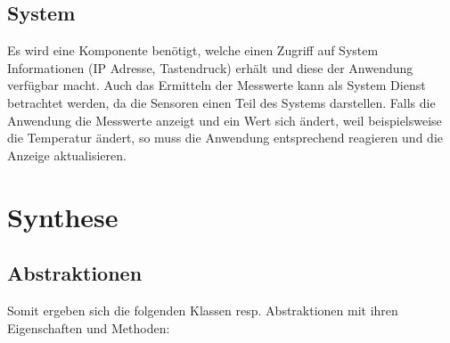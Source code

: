 \documentclass[
    10pt,
    a4paper,
]{scrartcl}
\begin{document}
\subsection{System}
Es wird eine Komponente benötigt, welche einen Zugriff auf System Informationen (IP
Adresse, Tastendruck) erhält und diese der Anwendung verfügbar macht. Auch das Ermitteln
der Messwerte kann als System Dienst betrachtet werden, da die Sensoren einen Teil des
Systems darstellen. Falls die Anwendung die Messwerte anzeigt und ein Wert sich ändert,
weil beispielsweise die Temperatur ändert, so muss die Anwendung entsprechend reagieren
und die Anzeige aktualisieren.

\section{Synthese}

\subsection{Abstraktionen}
Somit ergeben sich die folgenden Klassen resp. Abstraktionen mit ihren Eigenschaften und
Methoden:
\end{document}
